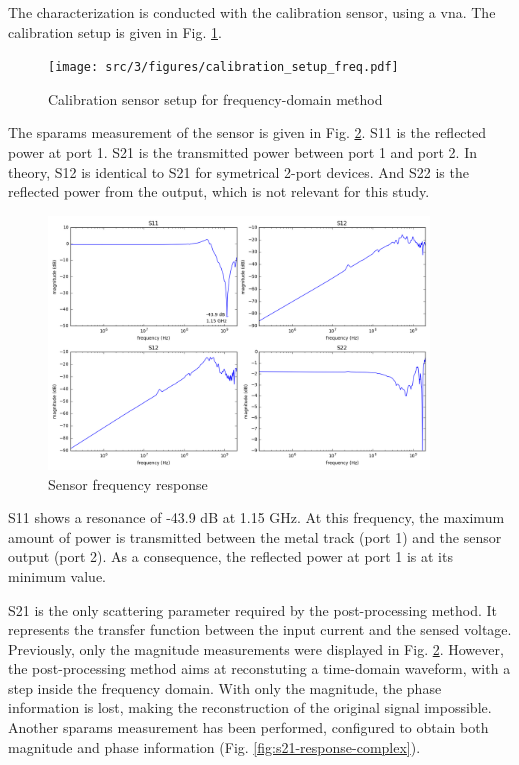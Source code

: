 The characterization is conducted with the calibration sensor, using a \gls{vna}.
The calibration setup is given in Fig. \ref{fig:calibration-sensor}.

\begin{figure}[!htbp]
  \centering
  \texttt{[image: src/3/figures/calibration\_setup\_freq.pdf]}
  \caption{Calibration sensor setup for frequency-domain method}
  \label{fig:calibration-sensor}
\end{figure}

The \gls{sparams} measurement of the sensor is given in Fig. \ref{fig:sensor-response}.
S11 is the reflected power at port 1.
S21 is the transmitted power between port 1 and port 2.
In theory, S12 is identical to S21 for symetrical 2-port devices.
And S22 is the reflected power from the output, which is not relevant for this study.

\begin{figure}[!htbp]
  \centering
  \includegraphics[width=0.9\textwidth]{src/3/figures/sensor_freq_response.png}
  \caption{Sensor frequency response}
  \label{fig:sensor-response}
\end{figure}

S11 shows a resonance of -43.9 dB at 1.15 GHz.
At this frequency, the maximum amount of power is transmitted between the metal track (port 1) and the sensor output (port 2).
As a consequence, the reflected power at port 1 is at its minimum value.

S21 is the only scattering parameter required by the post-processing method.
It represents the transfer function between the input current and the sensed voltage.
Previously, only the magnitude measurements were displayed in Fig. \ref{fig:sensor-response}.
However, the post-processing method aims at reconstuting a time-domain waveform, with a step inside the frequency domain.
With only the magnitude, the phase information is lost, making the reconstruction of the original signal impossible.
Another \gls{sparams} measurement has been performed, configured to obtain both magnitude and phase information (Fig. \ref{fig:s21-response-complex}).


